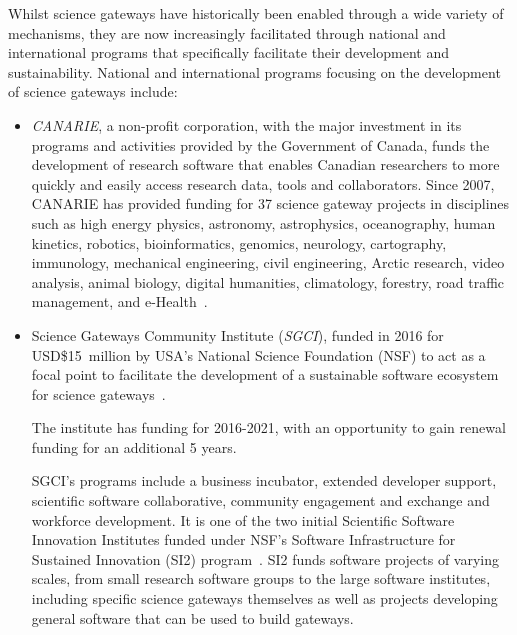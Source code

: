 \documentclass[review]{elsarticle}
\newcommand{\changedtext}[1]{
	{#1}
}
\begin{document}
Whilst science gateways have historically been enabled through a wide variety of mechanisms, they are now increasingly facilitated through national and international programs that specifically facilitate their development and sustainability. 
National and international programs focusing on the development of science gateways include:

\begin{itemize}

\item \emph{CANARIE}, a non-profit corporation, with the major investment in its programs and activities provided by the Government of Canada, funds the development of research software that enables Canadian researchers to more quickly and easily access research data, tools and collaborators. Since 2007, CANARIE has provided funding for 37 science gateway projects in disciplines such as high energy physics, astronomy, astrophysics, oceanography, human kinetics, robotics, bioinformatics, genomics, neurology, cartography, immunology, mechanical engineering, civil engineering, Arctic research, video analysis, animal biology, digital humanities, climatology, forestry, road traffic management, and e-Health~\cite{canarie-15}. 

\item Science Gateways Community Institute (\emph{SGCI}), funded in 2016 for \mbox{USD\$15 million} by USA's National Science Foundation (NSF) to act as a focal point to facilitate the development of a sustainable software ecosystem for science gateways~\cite{sgci-16}.
\changedtext{The institute has funding for 2016-2021, with an  opportunity to gain renewal funding for an additional 5 years.}
 SGCI's programs include a business incubator, extended developer support, scientific software collaborative, community engagement and exchange and workforce development. It is one of the two initial Scientific Software Innovation Institutes funded under NSF's Software Infrastructure for Sustained Innovation (SI2) program~\cite{nsf-si-17}. SI2 funds software projects of varying scales, from small research software groups to the large software institutes, including specific science gateways themselves as well as projects developing general software that can be used to build gateways. 


\end{itemize}
\end{document}
